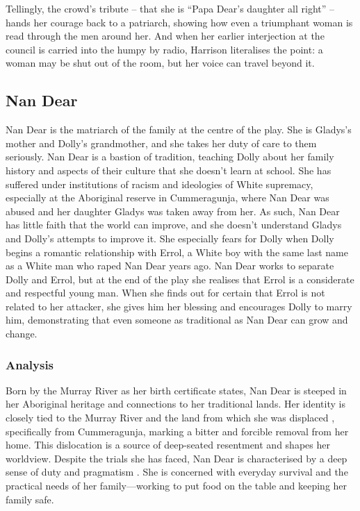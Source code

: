 \documentclass[a4paper]{article}
\begin{document}
Tellingly, the crowd's tribute -- that she is ``Papa Dear's daughter all right'' -- hands her courage back to a patriarch, showing how even a triumphant woman is read through the men around her. And when her earlier interjection at the council is carried into the humpy by radio, Harrison literalises the point: a woman may be shut out of the room, but her voice can travel beyond it.\\

\subsection{Nan Dear}
Nan Dear is the matriarch of the family at the
centre of the play. She is Gladys’s mother and Dolly’s
grandmother, and she takes her duty of care to them seriously.
Nan Dear is a bastion of tradition, teaching Dolly about her
family history and aspects of their culture that she doesn’t
learn at school. She has suffered under institutions of racism
and ideologies of White supremacy, especially at the Aboriginal
reserve in Cummeragunja, where Nan Dear was abused and
her daughter Gladys was taken away from her. As such, Nan
Dear has little faith that the world can improve, and she doesn’t
understand Gladys and Dolly’s attempts to improve it. She
especially fears for Dolly when Dolly begins a romantic
relationship with Errol, a White boy with the same last name as
a White man who raped Nan Dear years ago. Nan Dear works
to separate Dolly and Errol, but at the end of the play she
realises that Errol is a considerate and respectful young man.
When she finds out for certain that Errol is not related to her
attacker, she gives him her blessing and encourages Dolly to
marry him, demonstrating that even someone as traditional as
Nan Dear can grow and change.

\subsubsection{Analysis}
Born by the Murray River as her birth certificate states, Nan Dear
is steeped in her Aboriginal heritage and connections to her
traditional lands. Her identity is closely tied to the Murray River
and the land from which she was
displaced
, specifically from
Cummeragunja, marking a bitter and forcible removal from her
home. This
dislocation
is a source of deep-seated resentment
and shapes her worldview. Despite the trials she has faced, Nan
Dear is characterised by a deep sense of duty and
pragmatism
.
She is concerned with everyday survival and the practical needs
of her family—working to put food on the table and keeping her
family safe.\\
\end{document}
